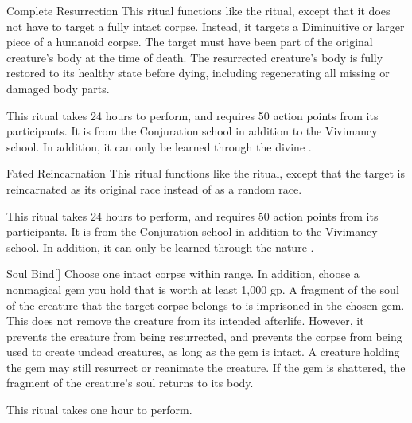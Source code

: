 \lowercase{\hypertarget{spell:Complete Resurrection}{}}\label{spell:Complete Resurrection}
\begin{ability}[\nth{5}]{\hypertarget{spell:Complete Resurrection}{Complete Resurrection}}
This ritual functions like the  ritual, except that it does not have to target a fully intact corpse.
Instead, it targets a Diminuitive or larger piece of a humanoid corpse.
The target must have been part of the original creature's body at the time of death.
The resurrected creature's body is fully restored to its healthy state before dying, including regenerating all missing or damaged body parts.

This ritual takes 24 hours to perform, and requires 50 action points from its participants.
It is from the Conjuration school in addition to the Vivimancy school.
In addition, it can only be learned through the divine .
\end{ability}
\vspace{0.25em}



\lowercase{\hypertarget{spell:Fated Reincarnation}{}}\label{spell:Fated Reincarnation}
\begin{ability}[\nth{5}]{\hypertarget{spell:Fated Reincarnation}{Fated Reincarnation}}
This ritual functions like the  ritual, except that the target is reincarnated as its original race instead of as a random race.

This ritual takes 24 hours to perform, and requires 50 action points from its participants.
It is from the Conjuration school in addition to the Vivimancy school.
In addition, it can only be learned through the nature .
\end{ability}
\vspace{0.25em}



\lowercase{\hypertarget{spell:Soul Bind}{}}\label{spell:Soul Bind}
\begin{ability}[\nth{5}]{\hypertarget{spell:Soul Bind}{Soul Bind}}[]
Choose one intact corpse within \rngclose range.
In addition, choose a nonmagical gem you hold that is worth at least 1,000 gp.
A fragment of the soul of the creature that the target corpse belongs to is imprisoned in the chosen gem.
This does not remove the creature from its intended afterlife.
However, it prevents the creature from being resurrected, and prevents the corpse from being used to create undead creatures, as long as the gem is intact.
A creature holding the gem may still resurrect or reanimate the creature.
If the gem is shattered, the fragment of the creature's soul returns to its body.

This ritual takes one hour to perform.
\end{ability}
\vspace{0.25em}



